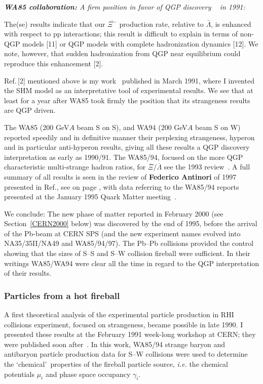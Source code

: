 \noindent \textit{\textbf{WA85 collaboration:} A firm position in favor of QGP discovery ~\cite{Abatzis:1991ju} in 1991:}\\[-0.7cm]
%
\begin{mdframed}[linecolor=gray,roundcorner=12pt,backgroundcolor=GreenYellow!15,linewidth=1pt,leftmargin=0cm,rightmargin=0cm,topline=true,bottomline=true,skipabove=12pt]\relax%
%
The(se) results indicate that our $\overline{\Xi^-}$ production rate, relative to $\bar{\Lambda}$, is enhanced with respect to pp interactions; this result is difficult to explain in terms of non-QGP models [11] or QGP models with complete hadronization dynamics [12]. We note, however, that sudden hadronization from QGP near equilibrium could reproduce this enhancement [2].
%
\end{mdframed}
\vskip 0.5cm

Ref.\,[2] mentioned above is my work~\cite{Rafelski:1991rh} published in March 1991, where I invented the SHM model as an interpretative tool of experimental results. We see that at least for a year after WA85 took firmly the position that its strangeness results are QGP driven.

The WA85 (200 GeV$A$ beam S on S), and WA94 (200 GeV$A$ beam S on W) reported speedily and in definitive manner their perplexing strangeness, hyperon and in particular anti-hyperon results, giving all these results a QGP discovery interpretation as early as 1990/91. The WA85/94, focused on the more QGP characteristic multi-strange hadron ratios, for $ \overline{\Xi}/\overline{\Lambda}$ see the 1993 review~\cite{Evans:1994sg}. A full summary of all results is seen in the review of \textbf{Federico Antinori} of 1997~\cite{Antinori:1997nn} presented in Ref.\cite{Omega25y}, see  on page \pageref{SigLamCERNFig}, with data referring to the WA85/94 reports presented at the January 1995 Quark Matter meeting~\cite{DiBari:1995cy,Kinson:1995cz}. 

We conclude: The new phase of matter reported in February 2000 (see Section~\ref{CERN2000} below) was discovered by the end of 1995, before the arrival of the Pb-beam at CERN SPS (and the new experiment names evolved into NA35/35II/NA49 and WA85/94/97). The Pb--Pb collisions provided the control showing that the sizes of S--S and S--W collision fireball were sufficient. In their writings WA85/WA94 were clear all the time in regard to the QGP interpretation of their results. 

\subsubsection{Particles from a hot fireball}\label{findingQGP}
A first theoretical analysis of the experimental particle production in RHI collisions experiment, focused on strangeness, became possible in late 1990. I presented these results at the February 1991 week-long workshop at CERN; they were published soon after~\cite{Rafelski:1991rh}. In this work, WA85/94 strange baryon and antibaryon particle production data for S--W collisions were used to determine the \lq chemical\rq\ properties of the fireball particle source, {\it i.e.} the chemical potentials $\mu_i$ and phase space occupancy $\gamma_i$. 

